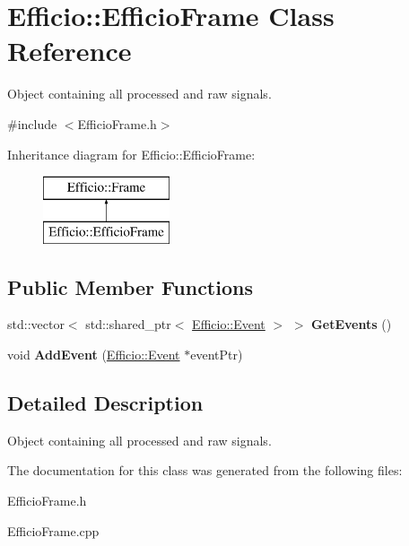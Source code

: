 \hypertarget{class_efficio_1_1_efficio_frame}{}\section{Efficio\+:\+:Efficio\+Frame Class Reference}
\label{class_efficio_1_1_efficio_frame}


Object containing all processed and raw signals.  




{\ttfamily \#include $<$Efficio\+Frame.\+h$>$}

Inheritance diagram for Efficio\+:\+:Efficio\+Frame\+:\begin{figure}[H]
\begin{center}
\leavevmode
\includegraphics[height=2.000000cm]{class_efficio_1_1_efficio_frame}
\end{center}
\end{figure}
\subsection*{Public Member Functions}
\begin{DoxyCompactItemize}
\item 
std\+::vector$<$ std\+::shared\+\_\+ptr$<$ \hyperlink{class_efficio_1_1_event}{Efficio\+::\+Event} $>$ $>$ {\bfseries Get\+Events} ()\hypertarget{class_efficio_1_1_efficio_frame_ac107005c4b5e46f3d799fba334a41e7d}{}\label{class_efficio_1_1_efficio_frame_ac107005c4b5e46f3d799fba334a41e7d}

\item 
void {\bfseries Add\+Event} (\hyperlink{class_efficio_1_1_event}{Efficio\+::\+Event} $\ast$event\+Ptr)\hypertarget{class_efficio_1_1_efficio_frame_a12a93aa5cdb21db333dcebaf38035063}{}\label{class_efficio_1_1_efficio_frame_a12a93aa5cdb21db333dcebaf38035063}

\end{DoxyCompactItemize}


\subsection{Detailed Description}
Object containing all processed and raw signals. 

The documentation for this class was generated from the following files\+:\begin{DoxyCompactItemize}
\item 
Efficio\+Frame.\+h\item 
Efficio\+Frame.\+cpp\end{DoxyCompactItemize}
